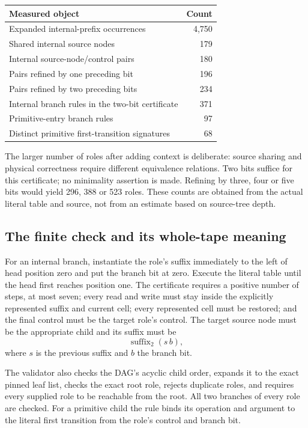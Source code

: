 \documentclass[11pt,a4paper]{article}
\begin{document}
\begin{center}
\begin{tabular}{lr}
\toprule
Measured object & Count\\
\midrule
Expanded internal-prefix occurrences & 4,750\\
Shared internal source nodes & 179\\
Internal source-node/control pairs & 180\\
Pairs refined by one preceding bit & 196\\
Pairs refined by two preceding bits & 234\\
Internal branch rules in the two-bit certificate & 371\\
Primitive-entry branch rules & 97\\
Distinct primitive first-transition signatures & 68\\
\bottomrule
\end{tabular}
\end{center}

The larger number of roles after adding context is deliberate: source
sharing and physical correctness require different equivalence relations.
Two bits suffice for this certificate; no minimality assertion is made.
Refining by three, four or five bits would yield 296, 388 or 523 roles.
These counts are obtained from the actual literal table and source, not
from an estimate based on source-tree depth.

\subsection{The finite check and its whole-tape meaning}

For an internal branch, instantiate the role's suffix immediately to the
left of head position zero and put the branch bit at zero. Execute the
literal table until the head first reaches position one. The certificate
requires a positive number of steps, at most seven; every read and write
must stay inside the explicitly represented suffix and current cell;
every represented cell must be restored; and the final control must be
the target role's control. The target source node must be the appropriate
child and its suffix must be
\[
 \operatorname{suffix}_2(s\,b),
\]
where $s$ is the previous suffix and $b$ the branch bit.

The validator also checks the DAG's acyclic child order, expands it to the
exact pinned leaf list, checks the exact root role, rejects duplicate
roles, and requires every supplied role to be reachable from the root.
All two branches of every role are checked. For a primitive child the
rule binds its operation and argument to the literal first transition
from the role's control and branch bit.
\end{document}
